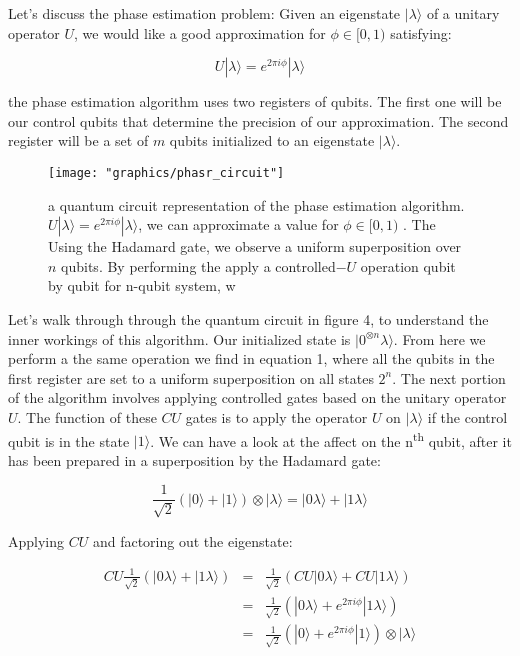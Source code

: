 \documentclass[twocolumn,showpacs,preprintnumbers,amsmath,amssymb]{revtex4}
\begin{document}
		
	    
		Let's discuss the phase estimation problem: Given an eigenstate $|\lambda \rangle$ of a unitary operator $U$, we would like a good approximation  for $\phi \in [0,1)$ satisfying:
		
		\begin{equation}
		 U |\lambda \rangle = e^{2\pi i \phi} |\lambda \rangle
	    \end{equation}
	    
	    the phase estimation algorithm uses two registers of qubits. The first one will be our control qubits that determine the precision of our approximation. The second register will be a set of $m$ qubits initialized to an eigenstate $|\lambda\rangle$.
	    
	    
		\begin{figure}[!h]
			\centering
			\texttt{[image: "graphics/phasr\_circuit"]}
			\caption{a quantum circuit representation of the phase estimation algorithm. $ U |\lambda \rangle = e^{2\pi i \phi} |\lambda \rangle $, we can  approximate a value for $\phi \in [0,1)$ . The  Using the Hadamard gate, we observe a uniform superposition over $n$ qubits. By performing the apply a controlled$-U$ operation qubit by qubit for n-qubit system, w}
			\label{fig:phasrcircuit}
		\end{figure}
		
		
		Let's walk through through the quantum circuit in figure 4, to understand the inner workings of this algorithm.	 Our initialized state is $|0^{\otimes n} \lambda\rangle$. From here we perform a the same operation we find in equation 1, where all the qubits in the first register are set to a uniform superposition on all states $2^n$. The next portion of the algorithm involves applying controlled gates based on the unitary operator $U$. The function of these $CU$ gates is to apply the operator $U$ on $|\lambda\rangle$ if the control qubit is in the state $|1\rangle$. We can have a look at the affect on the n\textsuperscript{th} qubit, after it has been prepared in a superposition by the Hadamard gate:
		
		$$ \frac{1}{\sqrt{2}}(|0\rangle + |1\rangle) \otimes |\lambda\rangle = |0 \lambda \rangle + |1 \lambda\rangle$$
		
		Applying $CU$ and factoring out the eigenstate:
		
		\begin{eqnarray*}
		 CU \frac{1}{\sqrt{2}}(|0 \lambda \rangle + |1 \lambda\rangle) &=&  \frac{1}{\sqrt{2}}(CU|0 \lambda \rangle + CU|1 \lambda\rangle )\\
		 &=& \frac{1}{\sqrt{2}}(|0 \lambda \rangle + e^{2\pi i \phi}|1 \lambda\rangle)\\
		 &=&\frac{1}{\sqrt{2}}( |0 \rangle + e^{2\pi i \phi}|1 \rangle)\otimes |\lambda\rangle
		\end{eqnarray*}
		
\end{document}

